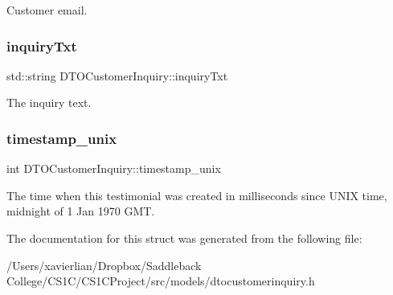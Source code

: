 Customer email. \mbox{\label{struct_d_t_o_customer_inquiry_a22e1c2babfe2efd005d4e9e048a13f89}} 
\subsubsection{\texorpdfstring{inquiryTxt}{inquiryTxt}}
{\footnotesize\ttfamily std\+::string D\+T\+O\+Customer\+Inquiry\+::inquiry\+Txt}

The inquiry text. \mbox{\label{struct_d_t_o_customer_inquiry_a77170a12cf54b579b1fe6bb707f325f3}} 
\subsubsection{\texorpdfstring{timestamp\_unix}{timestamp\_unix}}
{\footnotesize\ttfamily int D\+T\+O\+Customer\+Inquiry\+::timestamp\+\_\+unix}

The time when this testimonial was created in milliseconds since U\+N\+IX time, midnight of 1 Jan 1970 G\+MT. 

The documentation for this struct was generated from the following file\+:\begin{DoxyCompactItemize}
\item 
/\+Users/xavierlian/\+Dropbox/\+Saddleback College/\+C\+S1\+C/\+C\+S1\+C\+Project/src/models/dtocustomerinquiry.\+h\end{DoxyCompactItemize}

